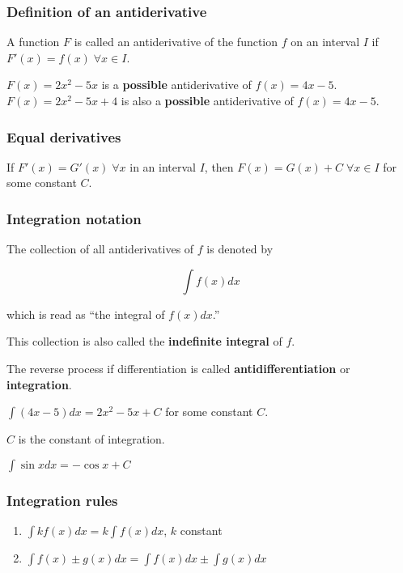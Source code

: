 \documentclass[
]{article}
\begin{document}
\hypertarget{definition-of-an-antiderivative}{%
\subsubsection{Definition of an
antiderivative}\label{definition-of-an-antiderivative}}

A function \(F\) is called an antiderivative of the function \(f\) on an
interval \(I\) if \(F'(x) = f(x) \;\forall x \in I\).

\(F(x)=2x^2-5x\) is a \textbf{possible} antiderivative of \(f(x)=4x-5\).
\(F(x)=2x^2-5x+4\) is also a \textbf{possible} antiderivative of
\(f(x)=4x-5\).

\hypertarget{equal-derivatives-1}{%
\subsubsection{Equal derivatives}\label{equal-derivatives-1}}

If \(F'(x)=G'(x) \;\forall x\) in an interval \(I\), then
\(F(x) = G(x) + C \;\forall x \in I\) for some constant \(C\).

\hypertarget{integration-notation}{%
\subsubsection{Integration notation}\label{integration-notation}}

The collection of all antiderivatives of \(f\) is denoted by

\[ \int f(x)dx \]

which is read as ``the integral of \(f(x)dx\).''

This collection is also called the \textbf{indefinite integral} of
\(f\).

The reverse process if differentiation is called
\textbf{antidifferentiation} or \textbf{integration}.

\(\int (4x-5)dx = 2x^2-5x+C\) for some constant \(C\).

\(C\) is the constant of integration.

\(\int \sin xdx = -\cos x+C\)

\hypertarget{integration-rules}{%
\subsubsection{Integration rules}\label{integration-rules}}

\begin{enumerate}
\def\labelenumi{\arabic{enumi}.}
\item
  \(\int kf(x)dx = k \int f(x)dx\), \(k\) constant
\item
  \(\int f(x) \pm g(x) dx = \int f(x)dx \pm \int g(x)dx\)
\end{enumerate}
\end{document}
